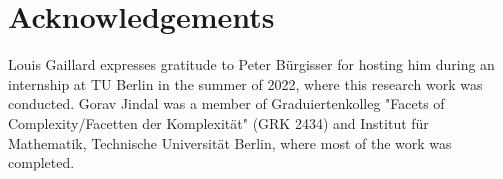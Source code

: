 \documentclass[a4paper, 11pt,dvipsnames]{article}
\begin{document}
\section{Acknowledgements}
 Louis Gaillard expresses gratitude to Peter B\"urgisser for hosting him during an internship at TU Berlin in the summer of 2022, where this research work was conducted.
Gorav Jindal was a member of Graduiertenkolleg "Facets of Complexity/Facetten der Komplexit\"at" (GRK 2434) and Institut f\"ur Mathematik, Technische Universit\"at Berlin, where most of the work was completed.
                 
\end{document}
